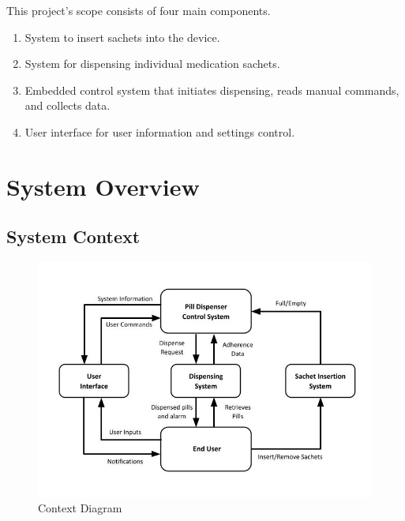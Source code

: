 \documentclass[12pt,titlepage]{article}
\begin{document}
This project's scope consists of four main components.
\begin{enumerate}
    \item System to insert sachets into the device.
    \item System for dispensing individual medication sachets.
    \item Embedded control system that initiates dispensing, reads manual commands, and collects data.
    \item User interface for user information and settings control.
\end{enumerate}

\pagebreak
\section{System Overview}
\subsection{System Context}

 \begin{figure}[!htbp]
  \centering
  \includegraphics[width=1\linewidth]{ContextDiagram.jpg}
  \caption{Context Diagram}
\end{figure}
\pagebreak
\end{document}
